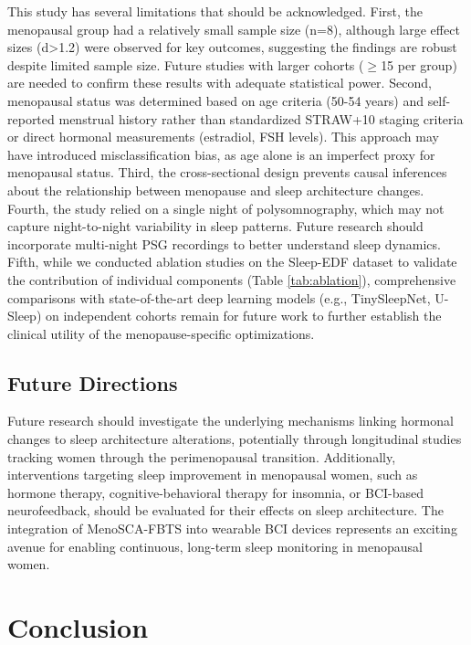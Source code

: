 \documentclass[a4paper,fleqn]{cas-dc}
\begin{document}
This study has several limitations that should be acknowledged. First, the menopausal group had a relatively small sample size (n=8), although large effect sizes (d>1.2) were observed for key outcomes, suggesting the findings are robust despite limited sample size. Future studies with larger cohorts ($\geq$15 per group) are needed to confirm these results with adequate statistical power. Second, menopausal status was determined based on age criteria (50-54 years) and self-reported menstrual history rather than standardized STRAW+10 staging criteria or direct hormonal measurements (estradiol, FSH levels). This approach may have introduced misclassification bias, as age alone is an imperfect proxy for menopausal status. Third, the cross-sectional design prevents causal inferences about the relationship between menopause and sleep architecture changes. Fourth, the study relied on a single night of polysomnography, which may not capture night-to-night variability in sleep patterns. Future research should incorporate multi-night PSG recordings to better understand sleep dynamics. Fifth, while we conducted ablation studies on the Sleep-EDF dataset to validate the contribution of individual components (Table \ref{tab:ablation}), comprehensive comparisons with state-of-the-art deep learning models (e.g., TinySleepNet, U-Sleep) on independent cohorts remain for future work to further establish the clinical utility of the menopause-specific optimizations.

\subsection{Future Directions}

Future research should investigate the underlying mechanisms linking hormonal changes to sleep architecture alterations, potentially through longitudinal studies tracking women through the perimenopausal transition. Additionally, interventions targeting sleep improvement in menopausal women, such as hormone therapy, cognitive-behavioral therapy for insomnia, or BCI-based neurofeedback, should be evaluated for their effects on sleep architecture. The integration of MenoSCA-FBTS into wearable BCI devices represents an exciting avenue for enabling continuous, long-term sleep monitoring in menopausal women.

\section{Conclusion}\label{sec5}
\end{document}
